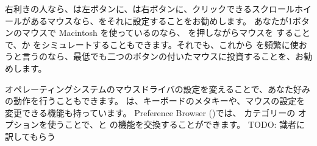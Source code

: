 \documentclass[a4paper,10pt,twoside]{book}
\begin{document}





右利きの人なら、\click は左ボタンに、\actclick は右ボタンに、クリックできるスクロールホイールがあるマウスなら、\metaclick をそれに設定することをお勧めします。
あなたが1ボタンのマウスで Macintosh を使っているのなら、\clover{} を押しながらマウスを \click することで、\actclick か \metaclick をシミュレートすることもできます。それでも、これから \pharo を頻繁に使おうと言うのなら、最低でも二つのボタンの付いたマウスに投資することを、お勧めします。

オペレーティングシステムのマウスドライバの設定を変えることで、あなた好みの動作を行うこともできます。
\pharo は、キーボードのメタキーや、マウスの設定を変更できる機能も持っています。
Preference Browser ()では、 カテゴリーの  オプションを使うことで、\actclick と \metaclick の機能を交換することができます。
TODO: 識者に訳してもらう
\end{document}

